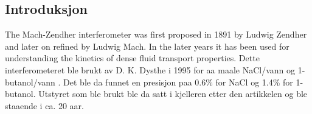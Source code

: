 \subsection {Introduksjon}
  The Mach-Zendher interferometer was first proposed in 1891 by Ludwig Zendher
  \cite{lz} and later on refined by Ludwig Mach\cite{lm}.
  In the later years it has been used for understanding the kinetics of dense
  fluid transport properties\cite{th,dym}.
  Dette interferometeret ble brukt av D. K. Dysthe i 1995 for aa maale NaCl/vann og
  1-butanol/vann \cite{dag}. Det ble da funnet en presisjon paa 0.6\% for NaCl og
  1.4\% for 1-butanol. Utstyret som ble brukt ble da satt i kjelleren etter den 
  artikkelen og ble staaende i ca. 20 aar. 
